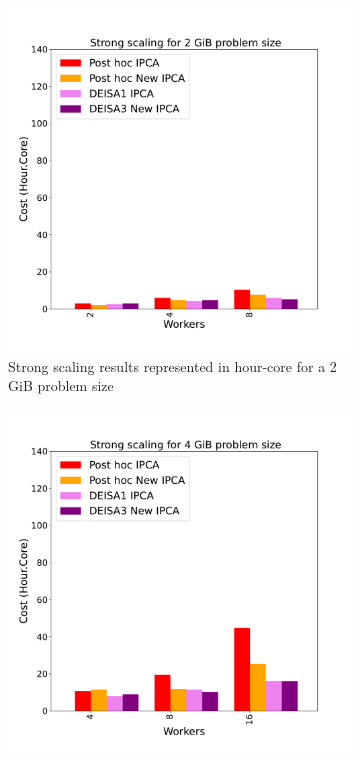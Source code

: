 \begin{figure}[hb]
     \centering
     \begin{subfigure}[b]{0.4\textwidth}
         \centering
         \includegraphics[width=\textwidth, height=\textwidth]{figures/AD2_1vs3vspost1vspost2.pdf}
         \caption{Strong scaling results represented in hour-core for a 2\,GiB problem size}
         \label{fig:AD2}
     \end{subfigure}
     \hfill
     \begin{subfigure}[b]{0.4\textwidth}
         \centering
         \includegraphics[width=\textwidth, height=\textwidth]{figures/AD4_1vs3vspost1vspost2.pdf}

\end{subfigure}
\end{figure}
